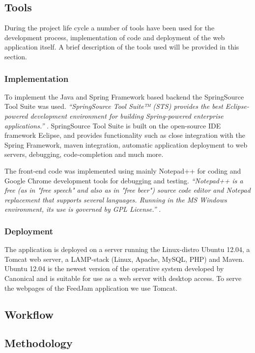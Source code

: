 \subsection{Tools} %
During the project life cycle a number of tools have been used for the development process, implementation of code and deployment of the web application itself. A brief description of the tools used will be provided in this section.

\subsubsection{Implementation}
To implement the Java and Spring Framework based backend the SpringSource Tool Suite was used. \textit{``SpringSource Tool Suite™ (STS) provides the best Eclipse-powered development environment for building Spring-powered enterprise applications.''} \cite{SpringSource}. SpringSource Tool Suite is built on the open-source IDE framework Eclipse, and provides functionality such as close integration with the Spring Framework, maven integration, automatic application deployment to web servers, debugging, code-completion and much more.

The front-end code was implemented using mainly Notepad++ for coding and Google Chrome development tools for debugging and testing. \textit{``Notepad++ is a free (as in "free speech" and also as in "free beer") source code editor and Notepad replacement that supports several languages. Running in the MS Windows environment, its use is governed by GPL License.''} \cite{Ho2012}.

\subsubsection{Deployment}
The application is deployed on a server running the Linux-distro Ubuntu 12.04, a Tomcat web server, a LAMP-stack (Linux, Apache, MySQL, PHP) and Maven. Ubuntu 12.04 is the newest version of the operative system developed by Canonical and is suitable for use as a web server with desktop access. To serve the webpages of the FeedJam application we use Tomcat. 

\subsection{Workflow}
\subsection{Methodology}

